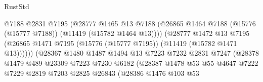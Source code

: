 \begin{lexlean}{RustStd}
\begin{coremodule}
                                          @7188
                                          @2831
                                          @7195
                                          (@28777
                                            @1465
                                            @13
                                            @7188
                                            (@26865
                                              @1464
                                              @7188
                                              (@15776 (@15777 @7188))
                                              (@11419 (@15782 @1464 @13))))
                                          (@28777
                                            @1472
                                            @13
                                            @7195
                                            (@26865
                                              @1471
                                              @7195
                                              (@15776 (@15777 @7195))
                                              (@11419 (@15782 @1471 @13))))))
                                      (@28367
                                        @1480
                                        @1487
                                        @1494
                                        @13
                                        @7223
                                        @7232
                                        @2831
                                        @7247
                                        (@28378
                                          @1479
                                          @489
                                          @23309
                                          @7223
                                          @7230
                                          @6182
                                          (@28387
                                            @1478
                                            @53
                                            @55
                                            @4647
                                            @7222
                                            @7229
                                            @2819
                                            @7203
                                            @2825
                                            @26843
                                            (@28386
                                              @1476
                                              @103
                                              @53

\end{coremodule}
\end{lexlean}
